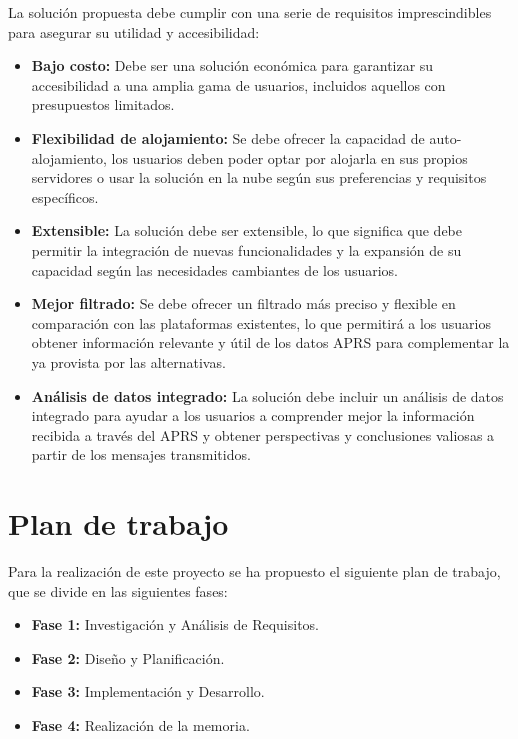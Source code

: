 La solución propuesta debe cumplir con una serie de requisitos imprescindibles para asegurar su utilidad y accesibilidad:

\begin{itemize}
    \item \textbf{Bajo costo:} Debe ser una solución económica para garantizar su accesibilidad a una amplia gama de usuarios, incluidos aquellos con presupuestos limitados.
    
    \item \textbf{Flexibilidad de alojamiento:} Se debe ofrecer la capacidad de auto-alojamiento, los usuarios deben poder optar por alojarla en sus propios servidores o usar la solución en la nube según sus preferencias y requisitos específicos.
    
    \item \textbf{Extensible:} La solución debe ser extensible, lo que significa que debe permitir la integración de nuevas funcionalidades y la expansión de su capacidad según las necesidades cambiantes de los usuarios.
    
    \item \textbf{Mejor filtrado:} Se debe ofrecer un filtrado más preciso y flexible en comparación con las plataformas existentes, lo que permitirá a los usuarios obtener información relevante y útil de los datos APRS para complementar la ya provista por las alternativas.
    
	\item \textbf{Análisis de datos integrado:} La solución debe incluir un análisis de datos integrado para ayudar a los usuarios a comprender mejor la información recibida a través del APRS y obtener perspectivas y conclusiones valiosas a partir de los mensajes transmitidos.
	
\end{itemize}

\section{Plan de trabajo}

Para la realización de este proyecto se ha propuesto el siguiente plan de trabajo, que se divide en las siguientes fases:

\begin{itemize}
	\item \textbf{Fase 1:} Investigación y Análisis de Requisitos.
	\item \textbf{Fase 2:} Diseño y Planificación.
	\item \textbf{Fase 3:} Implementación y Desarrollo.
	\item \textbf{Fase 4:} Realización de la memoria.
\end{itemize}

